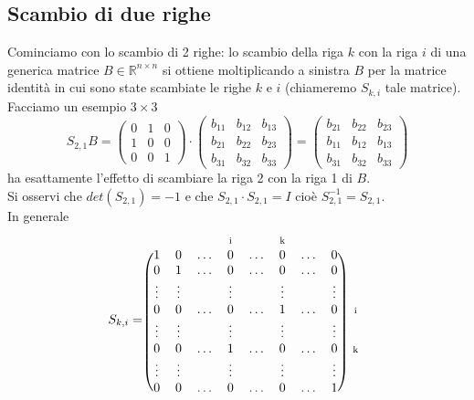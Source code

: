 \documentclass[12pt,a4paper]{article}
\newcommand{\matindex}[1]{\mbox{\scriptsize#1}}%
\begin{document}
\subsection{Scambio di due righe}
Cominciamo con lo scambio di 2 righe: lo scambio della riga $k$ con la riga $i$ di una generica matrice $B\in\mathbb{R}^{n\times n}$ si ottiene moltiplicando a sinistra $B$ per la matrice identità in cui sono state scambiate le righe $k$ e $i$ (chiameremo $S_{k,i}$ tale matrice).\\Facciamo un esempio $3\times 3$
\begin{equation*}
    S_{2,1}B=
    \begin{pmatrix}
        0 & 1 & 0 \\
        1 & 0 & 0 \\
        0 & 0 & 1
    \end{pmatrix} \cdot \begin{pmatrix}
        b_{11} & b_{12} & b_{13} \\
        b_{21} & b_{22} & b_{23} \\
        b_{31} & b_{32} & b_{33}
    \end{pmatrix}=\begin{pmatrix}
        b_{21} & b_{22} & b_{23} \\
        b_{11} & b_{12} & b_{13} \\
        b_{31} & b_{32} & b_{33}
    \end{pmatrix}
\end{equation*}
ha esattamente l'effetto di scambiare la riga 2 con la riga 1 di $B$.\\Si osservi che $det(S_{2,1})=-1$ e che $S_{2,1}\cdot S_{2,1}= I$ cioè $S_{2,1}^{-1}=S_{2,1}$.\\
In generale
\[
    S_{k,i}=\begin{blockarray}{ccccccccc}
        & & & \matindex{i} & &  \matindex{k} & & \\
        \begin{block}{(cccccccc)c}
        1 & 0 & \dots & 0 & \dots & 0 & \dots & 0 \\
        0 & 1 & \dots & 0 & \dots & 0 & \dots & 0 \\
        \vdots & \vdots &  & \vdots &  & \vdots &  & \vdots \\
        0 & 0 & \dots & 0 & \dots & 1 & \dots & 0 & \matindex{i} \\
        \vdots & \vdots &  & \vdots &  & \vdots &  & \vdots \\
        0 & 0 & \dots & 1 & \dots & 0 & \dots & 0 & \matindex{k} \\
        \vdots & \vdots &  & \vdots &  & \vdots &  & \vdots \\
        0 & 0 & \dots & 0 & \dots & 0 & \dots & 1 \\
        \end{block}
    \end{blockarray}
\]
\end{document}
